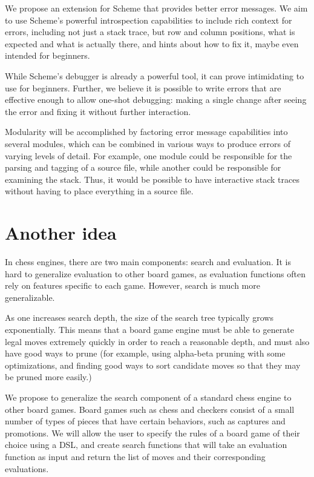 \documentclass{scrartcl}
\begin{document}
We propose an extension for Scheme that provides better error messages. We aim
to use Scheme's powerful introspection capabilities to include rich context for
errors, including not just a stack trace, but row and column positions, what is
expected and what is actually there, and hints about how to fix it, maybe even
intended for beginners.

While Scheme's debugger is already a powerful tool, it can prove intimidating
to use for beginners. Further, we believe it is possible to write errors that
are effective enough to allow one-shot debugging: making a single change after
seeing the error and fixing it without further interaction.

Modularity will be accomplished by factoring error message capabilities into
several modules, which can be combined in various ways to produce errors of
varying levels of detail. For example, one module could be responsible for the
parsing and tagging of a source file, while another could be responsible for
examining the stack. Thus, it would be possible to have interactive stack
traces without having to place everything in a source file.


\section{Another idea}

In chess engines, there are two main components: search and evaluation. It is hard to generalize evaluation to other board games, as evaluation functions often rely on features specific to each game. However, search is much more generalizable.

As one increases search depth, the size of the search tree typically grows exponentially. This means that a board game engine must be able to generate legal moves extremely quickly in order to reach a reasonable depth, and must also have good ways to prune (for example, using alpha-beta pruning with some optimizations, and finding good ways to sort candidate moves so that they may be pruned more easily.) 

We propose to generalize the search component of a standard chess engine to other board games. Board games such as chess and checkers consist of a small number of types of pieces that have certain behaviors, such as captures and promotions. We will allow the user to specify the rules of a board game of their choice using a DSL, and create search functions that will take an evaluation function as input and return the list of moves and their corresponding evaluations.
\end{document}
